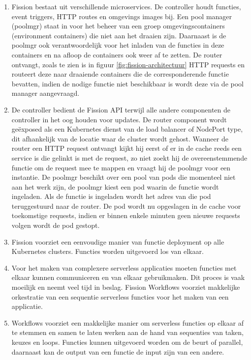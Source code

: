 \begin{enumerate}
    \item Fission bestaat uit verschillende microservices. De controller houdt functies, event triggers, HTTP routes en omgevings images bij. Een pool manager (poolmgr) staat in voor het beheer van een groep omgevingscontainers (environment containers) die niet aan het draaien zijn. Daarnaast is de poolmgr ook verantwoordelijk voor het inladen van de functies in deze containers en na afloop de containers ook weer af te zetten. De router ontvangt, zoals te zien is in figuur \ref{fig:fission-architectuur} HTTP requests en routeert deze naar draaiende containers die de corresponderende functie bevatten, indien de nodige functie niet beschikbaar is wordt deze via de pool manager aangevraagd. \autocite{Chemitiganti2018}
    \item De controller bedient de Fission API terwijl alle andere componenten de controller in het oog houden voor updates. De router component wordt geëxposed als een Kubernetes dienst van de load balancer of NodePort type, dit afhankelijk van de locatie waar de cluster wordt gehost. Wanneer de router een HTTP request ontvangt kijkt hij eerst of er in de cache reeds een service is die gelinkt is met de request, zo niet zoekt hij de overeenstemmende functie om de request mee te mappen en vraagt hij de poolmgr voor een instantie. De poolmgr beschikt over een pool van pods die momenteel niet aan het werk zijn, de poolmgr kiest een pod waarin de functie wordt ingeladen. Als de functie is ingeladen wordt het adres van die pod teruggestuurd naar de router. De pod wordt nu opgeslagen in de cache voor toekomstige requests, indien er binnen enkele minuten geen nieuwe requests volgen wordt de pod gestopt.  \autocite{Chemitiganti2018}
    \item Fission voorziet een eenvoudige manier van functie deployment op alle Kubernetes clusters. Functies worden uitgevoerd los van elkaar.
    \item Voor het maken van complexere serverless applicaties moeten functies met elkaar kunnen communiceren en van elkaar gebruikmaken. Dit proces is vaak moeilijk en neemt veel tijd in beslag. Fission Workflows voorziet makkelijke orkestratie van een sequentie serverless functies voor het maken van een applicatie. \autocite{Chemitiganti2018}
    \item Workflows voorziet een makkelijke manier om serverless functies op elkaar af te stemmen en samen te laten werken aan de hand van sequenties van taken, keuzes en loops. Functies kunnen uitgevoerd worden om de beurt of parallel, daarnaast kan de output van een functie de input zijn van een andere. \autocite{Chemitiganti2018}

\end{enumerate}
